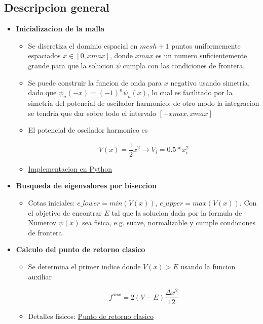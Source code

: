 \documentclass[11pt]{article}
\begin{document}
\subsection{Descripcion general}
\label{sec:orgecd7083}

\begin{itemize}
\item \textbf{Inicializacion de la malla}

\begin{itemize}
\item Se discretiza el dominio espacial en \(mesh + 1\) puntos uniformemente espaciados \(x \in [0,xmax]\), donde \(xmax\) es un numero suficientemente grande para que la solucion \(\psi\) cumpla con las condiciones de frontera.

\item Se puede construir la funcion de onda para \(x\) negativo usando simetria, dado que \(\psi_n(-x) = (-1)^n\psi_n(x)\), lo cual es facilitado por la simetria del potencial de oscilador harmonico; de otro modo la integracion se tendria que dar sobre todo el intervalo \([-xmax, xmax]\)

\item El potencial de oscilador harmonico es

\[ V(x) = \frac{1}{2}x^2 \to V_i = 0.5*x^2_i \]
\item \hyperref[sec:orgd400a5e]{Implementacion en Python}
\end{itemize}

\item \textbf{Busqueda de eigenvalores por biseccion}

\begin{itemize}
\item Cotas iniciales: \(e\_lower = min(V(x))\), \(e\_upper = max(V(x))\).
Con el objetivo de encontrar \(E\) tal que la solucion dada por la formula de Numerov \(\psi(x)\) sea fisica, e.g. suave, normalizable y cumple condiciones de frontera.
\end{itemize}

\item \textbf{Calculo del punto de retorno clasico}

\begin{itemize}
\item Se determina el primer indice donde \(V(x) > E\) usando la funcion auxiliar

\[ f^{aux} = 2(V-E) \frac{\Delta x^2}{12} \]

\item Detalles fisicos: \hyperref[sec:org17422d4]{Punto de retorno clasico}
\end{itemize}


\end{itemize}
\end{document}
